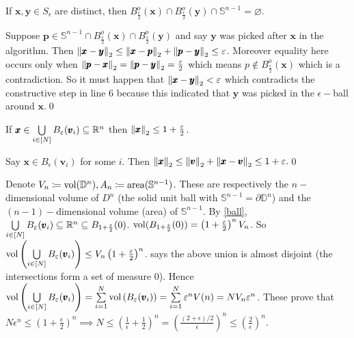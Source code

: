 \begin{enumerate}[leftmargin=*, label=(\alph*)]
\begin{cl}\label{disj}
If $\pmb x,\pmb y\in S_{\epsilon}$ are distinct, then $B_{\frac{\epsilon}{2}}^{o}(\pmb x)\cap B_{\frac{\epsilon}{2}}^{o}(\pmb y) \cap \mathbb S^{n-1} = \varnothing$.
\end{cl}
\begin{pf}
Suppose $\pmb p\in \mathbb S^{n-1}\cap B_{\frac{\epsilon}{2}}^{o}(\pmb x)\cap B_{\frac{\epsilon}{2}}^{o}(\pmb y)$ and say $\pmb y$ was picked after $\pmb x$ in the algorithm. Then $\left\lVert \pmb x-\pmb y \right\rVert_{2}\le \left\lVert \pmb x-\pmb p \right\rVert_{2} + \left\lVert \pmb p-\pmb y \right\rVert_{2} \le \varepsilon$. Moreover equality here occurs only when $\left\lVert \pmb p-\pmb x \right\rVert_{2} = \left\lVert \pmb p-\pmb y \right\rVert_{2}=\frac{\varepsilon}{2}$ which means $p\notin B_{\frac\epsilon2}^{o}(\pmb x)$ which is a contradiction. So it must happen that $\left\lVert \pmb x-\pmb y \right\rVert_{2}<\varepsilon$ which contradicts the constructive step in line $6$ because this indicated that $\pmb y$ was picked in the $\epsilon-$ball around $\pmb x$.\qed
\end{pf}

\begin{cl}\label{ball}
If $\pmb x\in \bigcup\limits_{i\in [N]}B_{\varepsilon}(\pmb v_{i})\subseteq \mathbb{R}^{n}$ then $\left\lVert \pmb x \right\rVert_{2}\le1+\frac{\varepsilon}{2}$.
\end{cl}
\begin{pf}
Say $\pmb x\in B_{\epsilon}(\pmb v_{i})$ for some $i$. Then 
$\left\lVert \pmb x \right\rVert_{2} \le \left\lVert \pmb v \right\rVert_{2} + \left\lVert \pmb x-\pmb v \right\rVert_{2} \le 1+\varepsilon.$\qed
\end{pf}

Denote $V_{n} \coloneqq \operatorname{vol}(\mathbb D^{n}), A_{n} \coloneqq \operatorname{area}(\mathbb S^{n-1})$. These are respectively the $n-$dimensional volume of $D^{n}$ (the solid unit ball with $\mathbb S^{n-1} = \partial \mathbb D^{n}$) and the $(n-1)-$dimensional volume (area) of $\mathbb S^{n-1}$. %
By \cref{ball}, $\bigcup\limits_{i\in [N]}B_{\varepsilon}(\pmb v_{i})\subseteq \mathbb{R}^{n} \subseteq B_{1+\frac{\varepsilon}{2}}(0)$. $\operatorname{vol}(B_{1+\frac{\varepsilon}{2}}(0)) = \left(1+\frac{\varepsilon}{2}\right)^{n}V_{n}$. So $\operatorname{vol}\left(\bigcup\limits_{i\in [N]}B_{\varepsilon}(\pmb v_{i})\right)\le V_{n}\left(1+\frac{\varepsilon}{2}\right)^{n}$.  says the above union is almost disjoint (the intersections form a set of measure $0$). Hence $\operatorname{vol}\left(\bigcup\limits_{i\in [N]}B_{\varepsilon}(\pmb v_{i})\right) = \sum\limits_{i=1}^{N}\operatorname{vol}\left(B_{\varepsilon}(\pmb v_{i})\right) = \sum\limits_{i=1}^{N}\varepsilon^{n}V(n) = NV_{n}\varepsilon^{n}$. These prove that $N\epsilon^{n}\le \left(1+\frac\epsilon2\right)^{n}\implies N\le \left(\frac{1}{\epsilon}+\frac{1}{2}\right)^{n} = \left(\frac{(2+\epsilon)/2}{\epsilon}\right)^{n} \le \left(\frac{2}{\epsilon}\right)^{n}$.
\end{enumerate}



